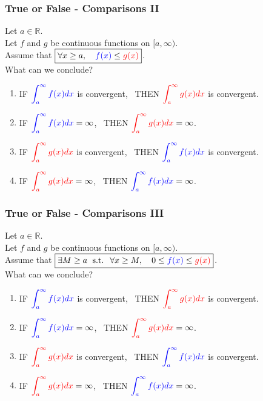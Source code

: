 \documentclass[14pt]{beamer}
\newcommand{\R}{\mathbb{R}}
\newcommand{\azul}[1]{{\color{blue} #1}}
\newcommand{\rojo}[1]{{\color{red} #1}}
\newcommand{\setsize}[1]{\fontsize{#1}{#1}\selectfont} %
\begin{document}
	\begin{frame}[t]
		\setsize{11}
		\frametitle{True or False - Comparisons II}

		Let $a \in \R$. \\ Let $f$ and $g$ be continuous functions on $[a, \infty)$.
		\\ Assume that ${\displaystyle \boxed{\forall x \geq a, \quad \azul{f(x)} \leq \rojo{g(x)}}}$.
		\\ What can we conclude?

		\begin{enumerate}
			\item IF ${\displaystyle \azul{\int_a^{\infty} f(x) dx}}$ is convergent,
				\, THEN ${\displaystyle \rojo{\int_a^{\infty} g(x) dx}}$ is convergent.

			\item IF ${\displaystyle \azul{\int_a^{\infty} f(x) dx} = \infty}$, \,
				THEN ${\displaystyle \rojo{\int_a^{\infty} g(x) dx} = \infty}$.

			\item IF ${\displaystyle \rojo{\int_a^{\infty} g(x) dx}}$ is convergent,
				\, THEN ${\displaystyle \azul{\int_a^{\infty} f(x) dx}}$ is convergent.

			\item IF ${\displaystyle \rojo{\int_a^{\infty} g(x) dx} = \infty}$, \,
				THEN ${\displaystyle \azul{\int_a^{\infty} f(x) dx} = \infty}$.
		\end{enumerate}
	\end{frame}
	\begin{frame}[t]
		\setsize{11}
		\frametitle{True or False - Comparisons III}

		Let $a \in \R$. \\ Let $f$ and $g$ be continuous functions on $[a, \infty)$.
		\\ Assume that ${\displaystyle \boxed{\exists M \geq a \; \mbox{ s.t. } \; \forall x \geq M, \quad 0 \leq \azul{f(x)} \leq \rojo{g(x)}}}$.
		\\ What can we conclude?

		\begin{enumerate}
			\item IF ${\displaystyle \azul{\int_a^{\infty} f(x) dx}}$ is convergent,
				\, THEN ${\displaystyle \rojo{\int_a^{\infty} g(x) dx}}$ is convergent.

			\item IF ${\displaystyle \azul{\int_a^{\infty} f(x) dx} = \infty}$, \,
				THEN ${\displaystyle \rojo{\int_a^{\infty} g(x) dx} = \infty}$.

			\item IF ${\displaystyle \rojo{\int_a^{\infty} g(x) dx}}$ is convergent,
				\, THEN ${\displaystyle \azul{\int_a^{\infty} f(x) dx}}$ is convergent.

			\item IF ${\displaystyle \rojo{\int_a^{\infty} g(x) dx} = \infty}$, \,
				THEN ${\displaystyle \azul{\int_a^{\infty} f(x) dx} = \infty}$.
		\end{enumerate}
	\end{frame}
\end{document}
